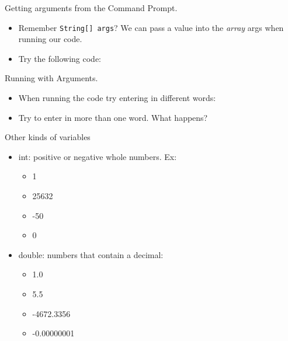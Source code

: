 \begin{frame}[fragile]{Getting arguments from the Command Prompt.}

\begin{itemize}
\item Remember \texttt{String[] args}? We can pass a value into the \emph{array} args when running our code.
\item Try the following code:
\end{itemize}
\begin{semiverbatim}\end{semiverbatim}
\end{frame}

\begin{frame}[fragile]{Running with Arguments.}
\begin{itemize}
\item When running the code try entering in different words:
\begin{semiverbatim}\end{semiverbatim}
\item Try to enter in more than one word. What happens?
\end{itemize}
\end{frame}

\begin{frame}{Other kinds of variables}
\begin{itemize}
\item int: positive or negative whole numbers. Ex:
\begin{itemize}
\item 1
\item 25632
\item -50
\item 0
\end{itemize}\pause
\item double: numbers that contain a decimal:
\begin{itemize}
\item 1.0
\item 5.5
\item -4672.3356
\item -0.00000001
\end{itemize}
\end{itemize}

\end{frame}


